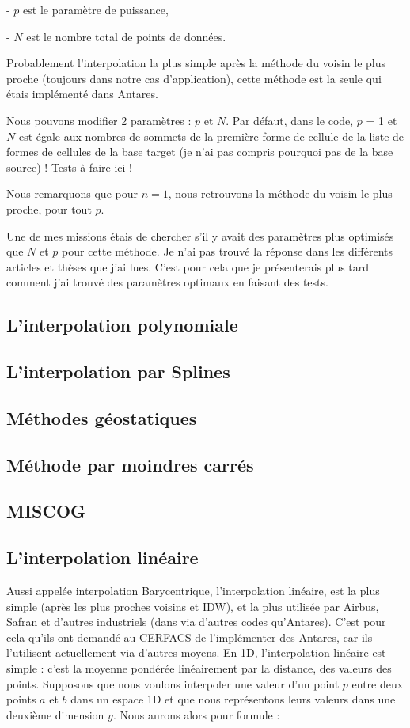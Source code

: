 - \(p\) est le paramètre de puissance,

- \(N\) est le nombre total de points de données.



Probablement l'interpolation la plus simple après la méthode du voisin le plus proche (toujours dans notre cas d'application), cette méthode est la seule qui étais implémenté dans Antares.

Nous pouvons modifier 2 paramètres : \(p\) et \(N\).
Par défaut, dans le code, \(p\) = 1 et \(N\) est égale aux nombres de sommets de la première forme de cellule de la liste de formes de cellules de la base target (je n'ai pas compris pourquoi pas de la base source) ! Tests à faire ici !


Nous remarquons que pour \( n = 1 \), nous retrouvons la méthode du voisin le plus proche, pour tout \( p \).

Une de mes missions étais de chercher s'il y avait des paramètres plus optimisés que \(N\) et \(p\) pour cette méthode. Je n'ai pas trouvé la réponse dans les différents articles et thèses que j'ai lues. C'est pour cela que je présenterais plus tard comment j'ai trouvé des paramètres optimaux en faisant des tests.


\subsection{L'interpolation polynomiale}
\subsection{L'interpolation par Splines}
\subsection{Méthodes géostatiques}
\subsection{Méthode par moindres carrés}
\subsection{MISCOG}

\subsection{L'interpolation linéaire}
Aussi appelée interpolation Barycentrique, l'interpolation linéaire, est la plus simple (après les plus proches voisins et IDW), et la plus utilisée par Airbus, Safran et d'autres industriels (dans via d'autres codes qu'Antares).
C'est pour cela qu'ils ont demandé au CERFACS de l'implémenter des Antares, car ils l'utilisent actuellement via d'autres moyens.
En 1D, l'interpolation linéaire est simple : c'est la moyenne pondérée linéairement par la distance, des valeurs des points.
Supposons que nous voulons interpoler une valeur d'un point \( p \) entre deux points \( a \) et \( b \) dans un espace 1D
et que nous représentons leurs valeurs dans une deuxième dimension \( y \).
Nous aurons alors pour formule :

